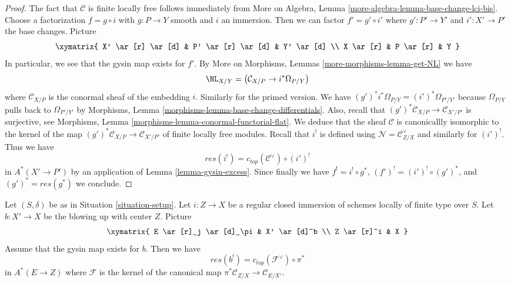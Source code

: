 \begin{proof}
The fact that $\mathcal{C}$ is finite locally free follows immediately
from More on Algebra, Lemma \ref{more-algebra-lemma-base-change-lci-bis}.
Choose a factorization $f = g \circ i$ with $g : P \to Y$ smooth and $i$
an immersion. Then we can factor $f' = g' \circ i'$ where $g' : P' \to Y'$
and $i' : X' \to P'$ the base changes. Picture
$$
\xymatrix{
X' \ar[r] \ar[d] &
P' \ar[r] \ar[d] &
Y' \ar[d] \\
X \ar[r] &
P \ar[r] &
Y
}
$$
In particular, we see that the gysin map exists for $f'$. By
More on Morphisms, Lemmas \ref{more-morphisms-lemma-get-NL}
we have
$$
\NL_{X/Y} = \left( \mathcal{C}_{X/P} \to i^*\Omega_{P/Y} \right)
$$
where $\mathcal{C}_{X/P}$ is the conormal sheaf of the embedding $i$.
Similarly for the primed version. We have
$(g')^*i^*\Omega_{P/Y} = (i')^*\Omega_{P'/Y'}$ because
$\Omega_{P/Y}$ pulls back to $\Omega_{P'/Y'}$ by
Morphisms, Lemma \ref{morphisms-lemma-base-change-differentials}.
Also, recall that $(g')^*\mathcal{C}_{X/P} \to \mathcal{C}_{X'/P'}$
is surjective, see
Morphisms, Lemma \ref{morphisms-lemma-conormal-functorial-flat}.
We deduce that the sheaf $\mathcal{C}$ is canonicallly
isomorphic to the kernel of the map
$(g')^*\mathcal{C}_{X/P} \to \mathcal{C}_{X'/P'}$
of finite locally free modules. Recall that $i^!$ is defined
using $\mathcal{N} = \mathcal{C}_{Z/X}^\vee$ and similarly
for $(i')^!$. Thus we have
$$
res(i^!) = c_{top}(\mathcal{C}^\vee) \circ (i')^!
$$
in $A^*(X' \to P')$ by an application of Lemma \ref{lemma-gysin-excess}.
Since finally we have $f^! = i^! \circ g^*$,
$(f')^! = (i')^! \circ (g')^*$, and $(g')^* = res(g^*)$ we conclude.
\end{proof}

\begin{lemma}
\label{lemma-blow-up-formula}
Let $(S, \delta)$ be as in Situation \ref{situation-setup}.
Let $i : Z \to X$ be a regular closed immersion of schemes
locally of finite type over $S$. Let $b : X' \to X$ be the
blowing up with center $Z$. Picture
$$
\xymatrix{
E \ar[r]_j \ar[d]_\pi & X' \ar[d]^b \\
Z \ar[r]^i & X
}
$$
Assume that the gysin map exists for $b$. Then we have
$$
res(b^!) = c_{top}(\mathcal{F}^\vee) \circ \pi^*
$$
in $A^*(E \to Z)$ where $\mathcal{F}$ is the kernel of the canonical map
$\pi^*\mathcal{C}_{Z/X} \to \mathcal{C}_{E/X'}$.
\end{lemma}

